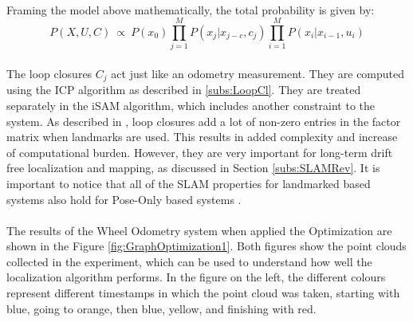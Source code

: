 \documentclass[12pt]{article}
\begin{document}
	\paragraph{}
	Framing the model above mathematically, the total probability is given by:
	\begin{equation}
	P(X,U,C)\ \propto \ P(x_0)\prod_{j=1}^{M}P(x_j|x_{j-c},c_j)\prod_{i=1}^{M}P(x_i|x_{i-1}, u_i)
	\label{probSLAMeq}
	\end{equation}
	
	\paragraph{}
	The loop closures $C_j$ act just like an odometry measurement. They are computed using the ICP algorithm as described in \ref{subs:LoopCl}. They are treated separately in the iSAM algorithm, which includes another constraint to the system. As described in \cite{Kaess08tro}, loop closures add a lot of non-zero entries in the factor matrix when landmarks are used. This results in added complexity and increase of computational burden. However, they are very important for long-term drift free localization and mapping, as discussed in Section \ref{subs:SLAMRev}. It is important to notice that all of the SLAM properties for landmarked based systems also hold for Pose-Only based systems \cite{Kaess08tro}.
	
	\paragraph{}
	The results of the Wheel Odometry system when applied the Optimization are shown in the Figure \ref{fig:GraphOptimization1}. Both figures show the  point clouds collected in the experiment, which can be used to understand how well the localization algorithm performs. In the figure on the left, the different colours represent different timestamps in which the point cloud was taken, starting with blue, going to orange, then blue, yellow, and finishing with red.
	
\end{document}
